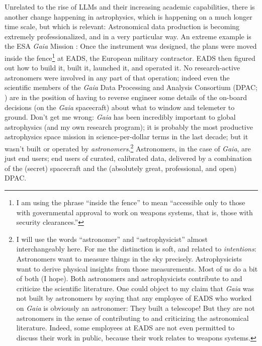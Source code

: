 \documentclass{article}
\begin{document}
Unrelated to the rise of LLMs and their increasing academic capabilities, there is another change happening in astrophysics, which is happening on a much longer time scale, but which is relevant:
Astronomical data production is becoming extremely professionalized, and in a very particular way.
An extreme example is the ESA \textsl{Gaia} Mission \cite{gaia}:
Once the instrument was designed, the plans were moved inside the fence\footnote{I am using the phrase ``inside the fence'' to mean ``accessible only to those with governmental approval to work on weapons systems, that is, those with security clearances.''} at EADS, the European military contractor.
EADS then figured out how to build it, built it, launched it, and operated it.
No research-active astronomers were involved in any part of that operation; indeed even the scientific members of the \textsl{Gaia} Data Processing and Analysis Consortium (DPAC; \cite{dpac}) are in the position of having to reverse engineer some details of the on-board decisions (on the \textsl{Gaia} spacecraft) about what to window and telemeter to ground.
Don't get me wrong: \textsl{Gaia} has been incredibly important to global astrophysics (and my own research program); it is probably the most productive astrophysics space mission in science-per-dollar terms in the last decade; but it wasn't built or operated by \emph{astronomers}.\footnote{%
I will use the words ``astronomer'' and ``astrophysicist'' almost interchangeably here. For me the distinction is soft, and related to \emph{intentions}:
Astronomers want to measure things in the sky precisely. Astrophysicists want to derive physical insights from those measurements.
Most of us do a bit of both (I hope).
Both astronomers and astrophysicists contribute to and criticize the scientific literature. One could object to my claim that \textsl{Gaia} was not built by astronomers by saying that any employee of EADS who worked on \textsl{Gaia} is obviously an astronomer:
They built a telescope!
But they are not astronomers in the sense of contributing to and criticizing the astronomical literature.
Indeed, some employees at EADS are not even permitted to discuss their work in public, because their work relates to weapons systems.}
Astronomers, in the case of \textsl{Gaia}, are just end users; end users of curated, calibrated data, delivered by a combination of the (secret) spacecraft and the (absolutely great, professional, and open) DPAC.
\end{document}
